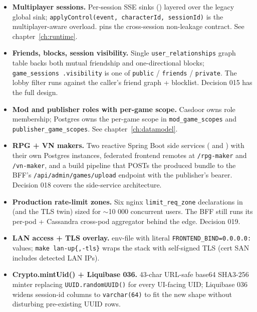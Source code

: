 \begin{itemize}
  \item \textbf{Multiplayer sessions.} Per-session SSE sinks
        () layered over
        the legacy global sink; \texttt{applyControl(event, characterId,
        sessionId)} is the multiplayer-aware overload.
         pins the cross-session
        non-leakage contract. See chapter~\ref{ch:runtime}.
  \item \textbf{Friends, blocks, session visibility.} Single
        \texttt{user\_relationships} graph table backs both mutual
        friendship and one-directional blocks; \texttt{game\_sessions
        .visibility} is one of \texttt{public} / \texttt{friends} /
        \texttt{private}. The lobby filter runs against the caller's
        friend graph + blocklist. Decision 015 has the full design.
  \item \textbf{Mod and publisher roles with per-game scope.} Casdoor
        owns role membership; Postgres owns the per-game scope in
        \texttt{mod\_game\_scopes} and \texttt{publisher\_game\_scopes}.
        See chapter~\ref{ch:datamodel}.
  \item \textbf{RPG + VN makers.} Two reactive Spring Boot side services
        ( and ) with their
        own Postgres instances, federated frontend remotes at
        \texttt{/rpg-maker} and \texttt{/vn-maker}, and a build pipeline
        that POSTs the produced bundle to the BFF's
        \texttt{/api/admin/games/upload} endpoint with the publisher's
        bearer. Decision 018 covers the side-service architecture.
  \item \textbf{Production rate-limit zones.} Six nginx
        \texttt{limit\_req\_zone} declarations in
         (and the TLS twin) sized for
        $\sim$10 000 concurrent users. The BFF still runs its per-pod
         + Cassandra cross-pod aggregator
        behind the edge. Decision 019.
  \item \textbf{LAN access + TLS overlay.} 
        env-file with literal \texttt{FRONTEND\_BIND=0.0.0.0:} values;
        \texttt{make lan-up\{,-tls\}} wraps the stack with self-signed
        TLS (cert SAN includes detected LAN IPs).
  \item \textbf{Crypto.mintUid() + Liquibase 036.} 43-char URL-safe
        base64 SHA3-256 minter replacing \texttt{UUID.randomUUID()} for
        every UI-facing UID; Liquibase 036 widens session-id columns to
        \texttt{varchar(64)} to fit the new shape without disturbing
        pre-existing UUID rows.
\end{itemize}
